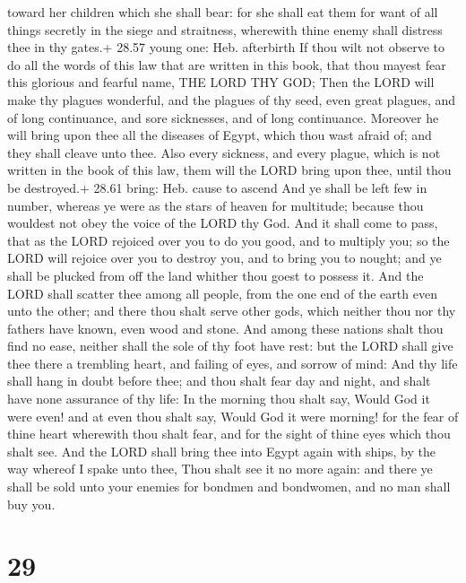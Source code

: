 toward her children which she shall bear: for she shall eat them for
want of all things secretly in the siege and straitness, wherewith thine
enemy shall distress thee in thy gates.+ 28.57 young one: Heb.
afterbirth  If thou wilt not observe to do all the words of
this law that are written in this book, that thou mayest fear this
glorious and fearful name, THE LORD THY GOD;  Then the LORD
will make thy plagues wonderful, and the plagues of thy seed, even great
plagues, and of long continuance, and sore sicknesses, and of long
continuance.  Moreover he will bring upon thee all the
diseases of Egypt, which thou wast afraid of; and they shall cleave unto
thee.  Also every sickness, and every plague, which is not
written in the book of this law, them will the LORD bring upon thee,
until thou be destroyed.+ 28.61 bring: Heb. cause to ascend
 And ye shall be left few in number, whereas ye were as the
stars of heaven for multitude; because thou wouldest not obey the voice
of the LORD thy God.  And it shall come to pass, that as
the LORD rejoiced over you to do you good, and to multiply you; so the
LORD will rejoice over you to destroy you, and to bring you to nought;
and ye shall be plucked from off the land whither thou goest to possess
it.  And the LORD shall scatter thee among all people, from
the one end of the earth even unto the other; and there thou shalt serve
other gods, which neither thou nor thy fathers have known, even wood and
stone.  And among these nations shalt thou find no ease,
neither shall the sole of thy foot have rest: but the LORD shall give
thee there a trembling heart, and failing of eyes, and sorrow of mind:
 And thy life shall hang in doubt before thee; and thou
shalt fear day and night, and shalt have none assurance of thy life:
 In the morning thou shalt say, Would God it were even! and
at even thou shalt say, Would God it were morning! for the fear of thine
heart wherewith thou shalt fear, and for the sight of thine eyes which
thou shalt see.  And the LORD shall bring thee into Egypt
again with ships, by the way whereof I spake unto thee, Thou shalt see
it no more again: and there ye shall be sold unto your enemies for
bondmen and bondwomen, and no man shall buy you.

\hypertarget{section-28}{%
\section{29}\label{section-28}}

